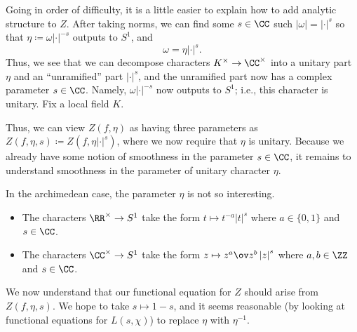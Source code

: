 \documentclass{article}
\begin{document}
Going in order of difficulty, it is a little easier to explain how to add analytic structure to $Z$. After taking norms, we can find some $s\in\CC$ such $\left|\omega\right|=\left|\cdot\right|^s$ so that $\eta\coloneqq\omega\left|\cdot\right|^{-s}$ outputs to $S^1$, and
\[\omega=\eta\left|\cdot\right|^s.\]
Thus, we see that we can decompose characters $K^\times\to\CC^\times$ into a unitary part $\eta$ and an ``unramified'' part $\left|\cdot\right|^s$, and the unramified part now has a complex parameter $s\in\CC$. Namely, $\omega\left|\cdot\right|^{-s}$ now outputs to $S^1$; i.e., this character is unitary.
Fix a local field $K$.

Thus, we can view $Z(f,\eta)$ as having three parameters as $Z(f,\eta,s)\coloneqq Z\left(f,\eta\left|\cdot\right|^s\right)$, where we now require that $\eta$ is unitary. Because we already have some notion of smoothness in the parameter $s\in\CC$, it remains to understand smoothness in the parameter of unitary character $\eta$.
\begin{example}
	In the archimedean case, the parameter $\eta$ is not so interesting.
	\begin{itemize}
		\item The characters $\RR^\times\to S^1$ take the form $t\mapsto t^{-a}\left|t\right|^s$ where $a\in\{0,1\}$ and $s\in\CC$.
		\item The characters $\CC^\times\to S^1$ take the form $z\mapsto z^a\ov z^b\left|z\right|^s$ where $a,b\in\ZZ$ and $s\in\CC$.
	\end{itemize}
\end{example}
We now understand that our functional equation for $Z$ should arise from $Z(f,\eta,s)$. We hope to take $s\mapsto1-s$, and it seems reasonable (by looking at functional equations for $L(s,\chi)$) to replace $\eta$ with $\eta^{-1}$.
\end{document}
